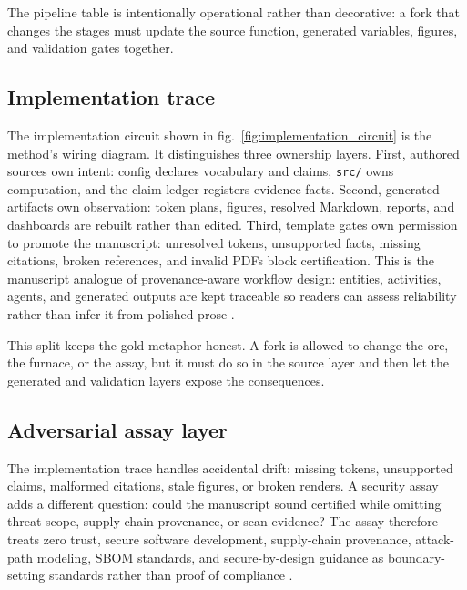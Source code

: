\documentclass[
]{article}
\begin{document}
The pipeline table is intentionally operational rather than decorative:
a fork that changes the stages must update the source function,
generated variables, figures, and validation gates together.

\subsection{Implementation trace}\label{implementation-trace}

The implementation circuit shown in
fig.~\ref{fig:implementation_circuit} is the method's wiring diagram. It
distinguishes three ownership layers. First, authored sources own
intent: config declares vocabulary and claims, \texttt{src/} owns
computation, and the claim ledger registers evidence facts. Second,
generated artifacts own observation: token plans, figures, resolved
Markdown, reports, and dashboards are rebuilt rather than edited. Third,
template gates own permission to promote the manuscript: unresolved
tokens, unsupported facts, missing citations, broken references, and
invalid PDFs block certification. This is the manuscript analogue of
provenance-aware workflow design: entities, activities, agents, and
generated outputs are kept traceable so readers can assess reliability
rather than infer it from polished prose
\citep{moreau2013prov, belhajjame2015ontologies}.

This split keeps the gold metaphor honest. A fork is allowed to change
the ore, the furnace, or the assay, but it must do so in the source
layer and then let the generated and validation layers expose the
consequences.

\subsection{Adversarial assay layer}\label{adversarial-assay-layer}

The implementation trace handles accidental drift: missing tokens,
unsupported claims, malformed citations, stale figures, or broken
renders. A security assay adds a different question: could the
manuscript sound certified while omitting threat scope, supply-chain
provenance, or scan evidence? The assay therefore treats zero trust,
secure software development, supply-chain provenance, attack-path
modeling, SBOM standards, and secure-by-design guidance as
boundary-setting standards rather than proof of compliance
\citep{nist_sp800_207_zero_trust, nist_sp800_218_ssdf, slsa_v1_2, sigstore_docs, mitre_attack, cyclonedx_spec, spdx_spec, cisa_secure_by_design}.
\end{document}
